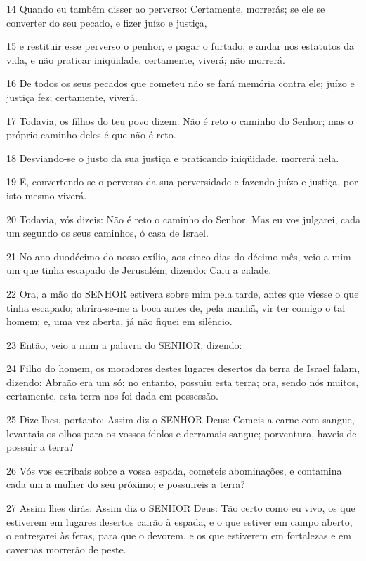 \par 14 Quando eu também disser ao perverso: Certamente, morrerás; se ele se converter do seu pecado, e fizer juízo e justiça,
\par 15 e restituir esse perverso o penhor, e pagar o furtado, e andar nos estatutos da vida, e não praticar iniqüidade, certamente, viverá; não morrerá.
\par 16 De todos os seus pecados que cometeu não se fará memória contra ele; juízo e justiça fez; certamente, viverá.
\par 17 Todavia, os filhos do teu povo dizem: Não é reto o caminho do Senhor; mas o próprio caminho deles é que não é reto.
\par 18 Desviando-se o justo da sua justiça e praticando iniqüidade, morrerá nela.
\par 19 E, convertendo-se o perverso da sua perversidade e fazendo juízo e justiça, por isto mesmo viverá.
\par 20 Todavia, vós dizeis: Não é reto o caminho do Senhor. Mas eu vos julgarei, cada um segundo os seus caminhos, ó casa de Israel.
\par 21 No ano duodécimo do nosso exílio, aos cinco dias do décimo mês, veio a mim um que tinha escapado de Jerusalém, dizendo: Caiu a cidade.
\par 22 Ora, a mão do SENHOR estivera sobre mim pela tarde, antes que viesse o que tinha escapado; abrira-se-me a boca antes de, pela manhã, vir ter comigo o tal homem; e, uma vez aberta, já não fiquei em silêncio.
\par 23 Então, veio a mim a palavra do SENHOR, dizendo:
\par 24 Filho do homem, os moradores destes lugares desertos da terra de Israel falam, dizendo: Abraão era um só; no entanto, possuiu esta terra; ora, sendo nós muitos, certamente, esta terra nos foi dada em possessão.
\par 25 Dize-lhes, portanto: Assim diz o SENHOR Deus: Comeis a carne com sangue, levantais os olhos para os vossos ídolos e derramais sangue; porventura, haveis de possuir a terra?
\par 26 Vós vos estribais sobre a vossa espada, cometeis abominações, e contamina cada um a mulher do seu próximo; e possuireis a terra?
\par 27 Assim lhes dirás: Assim diz o SENHOR Deus: Tão certo como eu vivo, os que estiverem em lugares desertos cairão à espada, e o que estiver em campo aberto, o entregarei às feras, para que o devorem, e os que estiverem em fortalezas e em cavernas morrerão de peste.

